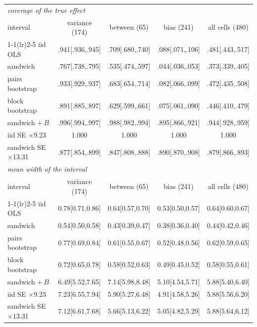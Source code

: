\footnotesize\setlength{\tabcolsep}{2.4pt}
\begin{tabular}{lcccc}
\toprule
\multicolumn{5}{l}{\emph{coverage of the true effect}} \\
interval & variance (174) & between (65) & bias (241) & all cells (480) \\
\cmidrule(lr){1-1}\cmidrule(lr){2-5}
iid OLS & .941[.936,.945] & .709[.680,.740] & .088[.071,.106] & .481[.443,.517] \\
sandwich & .767[.738,.795] & .535[.474,.597] & .044[.036,.053] & .373[.339,.405] \\
pairs bootstrap & .933[.929,.937] & .683[.654,.714] & .082[.066,.099] & .472[.435,.508] \\
block bootstrap & .891[.885,.897] & .629[.599,.661] & .075[.061,.090] & .446[.410,.479] \\
sandwich $+\,B$ & .996[.994,.997] & .988[.982,.994] & .895[.866,.921] & .944[.928,.959] \\
\addlinespace[1pt]
iid SE $\times$9.23 & 1.000 & 1.000 & 1.000 & 1.000 \\
sandwich SE $\times$13.31 & .877[.854,.899] & .847[.808,.888] & .890[.870,.908] & .879[.866,.893] \\
\midrule
\multicolumn{5}{l}{\emph{mean width of the interval}} \\
interval & variance (174) & between (65) & bias (241) & all cells (480) \\
\cmidrule(lr){1-1}\cmidrule(lr){2-5}
iid OLS & 0.78[0.71,0.86] & 0.64[0.57,0.70] & 0.53[0.50,0.57] & 0.64[0.60,0.67] \\
sandwich & 0.54[0.50,0.58] & 0.43[0.39,0.47] & 0.38[0.36,0.40] & 0.44[0.42,0.46] \\
pairs bootstrap & 0.77[0.69,0.84] & 0.61[0.55,0.67] & 0.52[0.48,0.56] & 0.62[0.59,0.65] \\
block bootstrap & 0.72[0.65,0.78] & 0.58[0.52,0.63] & 0.49[0.45,0.52] & 0.58[0.55,0.61] \\
sandwich $+\,B$ & 6.49[5.52,7.65] & 7.14[5.98,8.48] & 5.10[4.54,5.71] & 5.88[5.40,6.40] \\
\addlinespace[1pt]
iid SE $\times$9.23 & 7.23[6.55,7.94] & 5.90[5.27,6.48] & 4.91[4.58,5.26] & 5.88[5.56,6.20] \\
sandwich SE $\times$13.31 & 7.12[6.61,7.68] & 5.66[5.13,6.22] & 5.05[4.82,5.29] & 5.88[5.64,6.12] \\
\bottomrule
\end{tabular}
